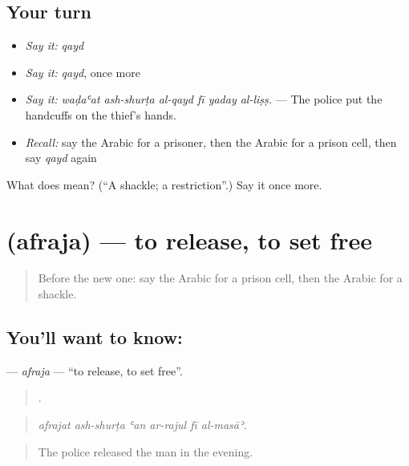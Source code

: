 \subsection*{Your turn}
\begin{itemize}
\raggedright
  \item \emph{Say it:} \emph{qayd}
  \item \emph{Say it:} \emph{qayd}, once more
  \item \emph{Say it:} \emph{waḍaʿat ash-shurṭa al-qayd fī yaday al-liṣṣ.} — The police put the handcuffs on the thief’s hands.
  \item \emph{Recall:} say the Arabic for a prisoner, then the Arabic for a prison cell, then say \emph{qayd} again
\end{itemize}

\begin{tcolorbox}[breakable,colback=teal!4,colframe=teal!35!black,title={Before you move on}]
What does  mean? (\textquotedblleft{}A shackle; a restriction\textquotedblright{}.) Say it once more.
\end{tcolorbox}
\section[\texorpdfstring{\ar{أفرج} (afraja)}{أفرج (afraja)}]{ (afraja) — to release, to set free}

\label{lesson:AR-C330-afraja}



\begin{quote}
Before the new one: say the Arabic for a prison cell, then the Arabic for a shackle.
\end{quote}

\subsection*{You'll want to know: }
\textbf{} — \emph{afraja} — \textquotedblleft{}to release, to set free\textquotedblright{}.

\begin{quote}
     .
\end{quote}

\begin{quote}
\emph{afrajat ash-shurṭa ʿan ar-rajul fī al-masāʾ.}
\end{quote}

\begin{quote}
The police released the man in the evening.
\end{quote}

